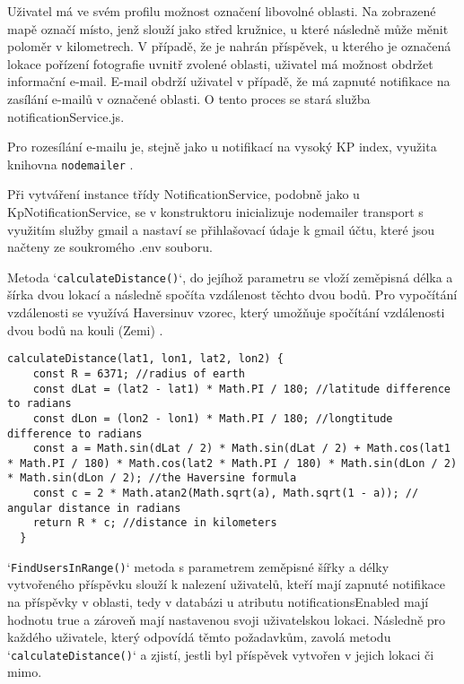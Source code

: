 \par Uživatel má ve svém profilu možnost označení libovolné oblasti. Na zobrazené mapě označí místo, jenž slouží jako střed kružnice, u které následně může měnit poloměr v kilometrech. V případě, že je nahrán příspěvek, u kterého je označená lokace pořízení fotografie uvnitř zvolené oblasti, uživatel má možnost obdržet informační e-mail. E-mail obdrží uživatel v případě, že má zapnuté notifikace na zasílání e-mailů v označené oblasti. O tento proces se stará služba notificationService.js.
\par Pro rozesílání e-mailu je, stejně jako u notifikací na vysoký KP index, využita knihovna \texttt{nodemailer} \cite{mailtrap_nodemailer} \cite{nodejs_nodemailer_tutorial}. 
\par Při vytváření instance třídy NotificationService, podobně jako u KpNotificationService, se v konstruktoru inicializuje nodemailer transport s využitím služby gmail a nastaví se přihlašovací údaje k gmail účtu, které jsou načteny ze soukromého .env souboru.
\par Metoda `\texttt{calculateDistance()}`, do jejíhož parametru se vloží zeměpisná délka a šírka dvou lokací a následně spočíta vzdálenost těchto dvou bodů. Pro vypočítání vzdálenosti se využívá Haversinuv vzorec, který umožňuje spočítání vzdálenosti dvou bodů na kouli (Zemi) \cite{latlong_distance_calculation}.
\begin{lstlisting}[caption = {Metoda pro spočítání vzdálenosti dvou bodů na kouli},label = {lst:stranka}]
  calculateDistance(lat1, lon1, lat2, lon2) {
    const R = 6371; //radius of earth
    const dLat = (lat2 - lat1) * Math.PI / 180; //latitude difference to radians
    const dLon = (lon2 - lon1) * Math.PI / 180; //longtitude difference to radians
    const a = Math.sin(dLat / 2) * Math.sin(dLat / 2) + Math.cos(lat1 * Math.PI / 180) * Math.cos(lat2 * Math.PI / 180) * Math.sin(dLon / 2) * Math.sin(dLon / 2); //the Haversine formula
    const c = 2 * Math.atan2(Math.sqrt(a), Math.sqrt(1 - a)); // angular distance in radians
    return R * c; //distance in kilometers 
  }
\end{lstlisting}
\par `\texttt{FindUsersInRange()}` metoda s parametrem zeměpisné šířky a délky vytvořeného příspěvku slouží k nalezení uživatelů, kteří mají zapnuté notifikace na příspěvky v oblasti, tedy v databázi u atributu notificationsEnabled mají hodnotu true a zároveň mají nastavenou svoji uživatelskou lokaci. Následně pro každého uživatele, který odpovídá těmto požadavkům, zavolá metodu `\texttt{calculateDistance()}` a zjistí, jestli byl příspěvek vytvořen v jejich lokaci či mimo.
